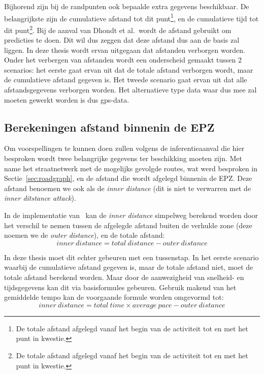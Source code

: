 Bijhorend zijn bij de randpunten ook bepaalde extra gegevens beschikbaar. De
belangrijkste zijn de cumulatieve afstand tot dit punt\footnote{De totale
    afstand afgelegd vanaf het begin van de activiteit tot en met het punt in
    kwestie.}, en de cumulatieve tijd tot dit punt\footnote{De totale afstand
    afgelegd vanaf het begin van de activiteit tot en met het punt in kwestie.}.
Bij de aanval van Dhondt et al.\ wordt de afstand gebruikt om predicties te
doen. Dit wil dus zeggen dat deze afstand dus aan de basis zal liggen. In deze
thesis wordt ervan uitgegaan dat afstanden verborgen worden. Onder het
verbergen van afstanden wordt een onderscheid gemaakt tussen 2 scenarios: het
eerste gaat ervan uit dat de totale afstand verborgen wordt, maar de
cumulatieve afstand gegeven is. Het tweede scenario gaat ervan uit dat alle
afstandsgegevens verborgen worden. Het alternatieve type data waar dus mee zal
moeten gewerkt worden is dus \ac{gps}-data.

\subsection{Berekeningen afstand binnenin de EPZ}\label{sec:berekeningen}
Om voorspellingen te kunnen doen zullen volgens de inferentieaanval die hier
besproken wordt twee belangrijke gegevens ter beschikking moeten zijn. Met name
het straatnetwerk met de mogelijks gevolgde routes, wat werd besproken in
Sectie~\ref{sec:roadgraph}, en de afstand die wordt afgelegd binnenin de
\ac{EPZ}. Deze afstand benoemen we ook als de \textit{inner distance} (dit is
niet te verwarren met de \textit{inner ditstance attack}).

In de implementatie
van~\citeauthor{Dhondt} kan de
\textit{inner distance} simpelweg berekend worden door het verschil te nemen
tussen de afgelegde afstand buiten de verhulde zone (deze noemen we de
\textit{outer distance}), en de totale afstand: \[inner\ distance = total\
    distance - outer\ distance \]

In deze thesis moet dit echter gebeuren met een tussenstap. In het eerste
scenario waarbij de cumulatieve afstand gegeven is, maar de totale afstand
niet, moet de totale afstand berekend worden. Maar door de aanwezigheid van
snelheid- en tijdsgegevens kan dit via basisformules gebeuren. Gebruik makend
van het gemiddelde tempo kan de voorgaande formule worden omgevormd tot: \[inner\ distance = total\ time \times average\ pace - outer\ distance \]

